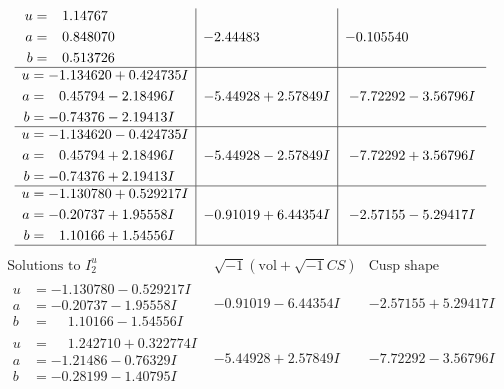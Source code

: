 \documentclass[1p]{elsarticle_modified}
\theoremstyle{definition}
\newcommand{\I}{\sqrt{-1}}
\begin{document}
$$\begin{array}{c|c|c}
\begin{aligned}
u &= \phantom{-}1.14767\phantom{ +0.000000I} \\
a &= \phantom{-}0.848070\phantom{ +0.000000I} \\
b &= \phantom{-}0.513726\phantom{ +0.000000I}\end{aligned}
 & -2.44483\phantom{ +0.000000I} & -0.105540\phantom{ +0.000000I} \\ \hline\begin{aligned}
u &= -1.134620 + 0.424735 I \\
a &= \phantom{-}0.45794 - 2.18496 I \\
b &= -0.74376 - 2.19413 I\end{aligned}
 & -5.44928 + 2.57849 I & -7.72292 - 3.56796 I \\ \hline\begin{aligned}
u &= -1.134620 - 0.424735 I \\
a &= \phantom{-}0.45794 + 2.18496 I \\
b &= -0.74376 + 2.19413 I\end{aligned}
 & -5.44928 - 2.57849 I & -7.72292 + 3.56796 I \\ \hline\begin{aligned}
u &= -1.130780 + 0.529217 I \\
a &= -0.20737 + 1.95558 I \\
b &= \phantom{-}1.10166 + 1.54556 I\end{aligned}
 & -0.91019 + 6.44354 I & -2.57155 - 5.29417 I\\
 \hline 
 \end{array}$$\newpage$$\begin{array}{c|c|c}  
\text{Solutions to }I^u_{2}& \I (\text{vol} + \sqrt{-1}CS) & \text{Cusp shape}\\
 \hline 
\begin{aligned}
u &= -1.130780 - 0.529217 I \\
a &= -0.20737 - 1.95558 I \\
b &= \phantom{-}1.10166 - 1.54556 I\end{aligned}
 & -0.91019 - 6.44354 I & -2.57155 + 5.29417 I \\ \hline\begin{aligned}
u &= \phantom{-}1.242710 + 0.322774 I \\
a &= -1.21486 - 0.76329 I \\
b &= -0.28199 - 1.40795 I\end{aligned}
 & -5.44928 + 2.57849 I & -7.72292 - 3.56796 I \\ \hline\begin{aligned}

\end{aligned}
\end{array}$$
\end{document}
